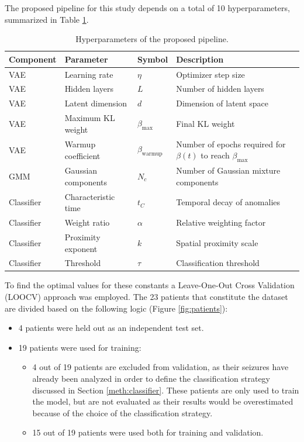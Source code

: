 The proposed pipeline for this study depends on a total of 10 hyperparameters,
summarized in Table \ref{tab:hyperparameters}.

\begin{table}[H]
\centering
\begin{tabularx}{\textwidth}{ll l X}
\hline
Component & Parameter & Symbol & Description \\
\hline
VAE & Learning rate & $\eta$ & Optimizer step size \\
VAE & Hidden layers & $L$ & Number of hidden layers \\
VAE & Latent dimension & $d$ & Dimension of latent space \\
VAE & Maximum KL weight & $\beta_{\text{max}}$ & Final KL weight \\
VAE & Warmup coefficient & $\beta_{\text{warmup}}$ & Number of epochs required for $\beta(t)$ to reach $\beta_{\text{max}}$ \\
GMM & Gaussian components & $N_c$ & Number of Gaussian mixture components \\
Classifier & Characteristic time & $t_C$ & Temporal decay of anomalies \\
Classifier & Weight ratio & $\alpha$ & Relative weighting factor \\
Classifier & Proximity exponent & $k$ & Spatial proximity scale \\
Classifier & Threshold & $\tau$ & Classification threshold \\
\hline
\end{tabularx}
\caption{Hyperparameters of the proposed pipeline.}
\label{tab:hyperparameters}
\end{table}

To find the optimal values for these constants a Leave-One-Out Cross Validation
(LOOCV) approach was employed.
The 23 patients that constitute the dataset are divided based on the following
logic (Figure \ref{fig:patients}):
\begin{itemize}
    \item 4 patients were held out as an independent test set.
    \item 19 patients were used for training:
    \begin{itemize}
        \item 4 out of 19 patients are excluded from validation, as their
        seizures have already been analyzed in order to define the classification
        strategy discussed in Section \ref{meth:classifier}.
        These patients are only used to train the model, but are not evaluated
        as their results would be overestimated because of the choice of the
        classification strategy.
        \item 15 out of 19 patients were used both for training and validation.
    \end{itemize}
\end{itemize}


